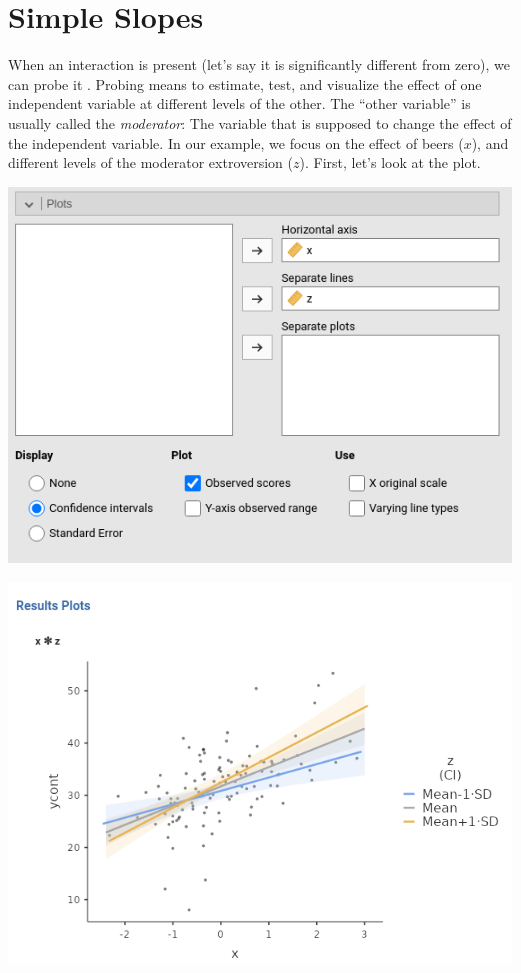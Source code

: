 \documentclass[
]{book}
\begin{document}
\hypertarget{simpleslopes}{%
\section{Simple Slopes}\label{simpleslopes}}

When an interaction is present (let's say it is significantly different from zero), we can probe it \citep{aiken1991multiple}. Probing means to estimate, test, and visualize the effect of one independent variable at different levels of the other. The ``other variable'' is usually called the \emph{moderator}: The variable that is supposed to change the effect of the independent variable. In our example, we focus on the effect of beers (\(x\)), and different levels of the moderator extroversion (\(z\)). First, let's look at the plot.

\includegraphics[width=7.81in]{bookletpics/2_input10}

\includegraphics[width=8.72in]{bookletpics/2_output12}
\end{document}
